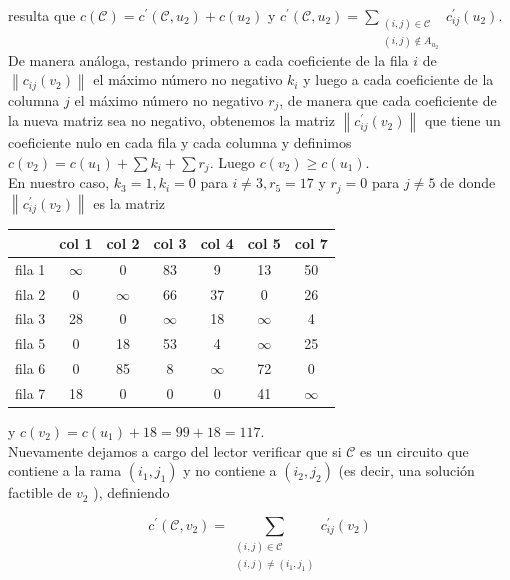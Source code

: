 \documentclass[10pt]{article}
\begin{document}
resulta que $c(\mathcal{C})=c^{\prime}\left(\mathcal{C}, u_{2}\right)+c\left(u_{2}\right)$ y $c^{\prime}\left(\mathcal{C}, u_{2}\right)=\sum_{\substack{(i, j) \in \mathcal{C} \\(i, j) \notin A_{u_{2}}}} c_{i j}^{\prime}\left(u_{2}\right)$.\\
De manera análoga, restando primero a cada coeficiente de la fila $i$ de $\left\|c_{i j}\left(v_{2}\right)\right\|$ el máximo número no negativo $k_{i}$ y luego a cada coeficiente de la columna $j$ el máximo número no negativo $r_{j}$, de manera que cada coeficiente de la nueva matriz sea no negativo, obtenemos la matriz $\left\|c_{i j}^{\prime}\left(v_{2}\right)\right\|$ que tiene un coeficiente nulo en cada fila y cada columna y definimos $c\left(v_{2}\right)=c\left(u_{1}\right)+\sum k_{i}+\sum r_{j}$. Luego $c\left(v_{2}\right) \geq c\left(u_{1}\right)$.\\
En nuestro caso, $k_{3}=1, k_{i}=0$ para $i \neq 3, r_{5}=17$ y $r_{j}=0$ para $j \neq 5$ de donde $\left\|c_{i j}^{\prime}\left(v_{2}\right)\right\|$ es la matriz

\begin{center}
\begin{tabular}{|l|c|c|c|c|c|c|}
\hline
 & col 1 & col 2 & col 3 & col 4 & col 5 & col 7 \\
\hline
fila 1 & $\infty$ & 0 & 83 & 9 & 13 & 50 \\
\hline
fila 2 & 0 & $\infty$ & 66 & 37 & 0 & 26 \\
\hline
fila 3 & 28 & 0 & $\infty$ & 18 & $\infty$ & 4 \\
\hline
fila 5 & 0 & 18 & 53 & 4 & $\infty$ & 25 \\
\hline
fila 6 & 0 & 85 & 8 & $\infty$ & 72 & 0 \\
\hline
fila 7 & 18 & 0 & 0 & 0 & 41 & $\infty$ \\
\hline
\end{tabular}
\end{center}

y $c\left(v_{2}\right)=c\left(u_{1}\right)+18=99+18=117$.\\
Nuevamente dejamos a cargo del lector verificar que si $\mathcal{C}$ es un circuito que contiene a la rama $\left(i_{1}, j_{1}\right)$ y no contiene a $\left(i_{2}, j_{2}\right)$ (es decir, una solución factible de $v_{2}$ ), definiendo

$$
c^{\prime}\left(\mathcal{C}, v_{2}\right)=\sum_{\substack{(i, j) \in \mathcal{C} \\(i, j) \neq\left(i_{1}, j_{1}\right)}} c_{i j}^{\prime}\left(v_{2}\right)
$$
\end{document}
